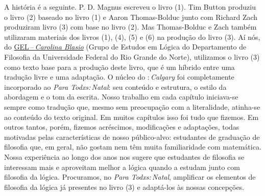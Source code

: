 \noindent A história é a seguinte.
P. D. Magnus escreveu o livro (1). Tim Button produziu o livro (2) baseado no livro (1) e Aaron Thomas-Bolduc junto com Richard Zach produziram  livro (3) com base no livro (2).
Mas Thomas-Bolduc e Zach também utilizaram materiais dos livros (1), (4), (5) e (6) na produção do livro (3).
Aí nós, do \href{https://gelogica.weebly.com/}{GEL\,--\,\textit{Carolina Blasio}} (Grupo de Estudos em Lógica do Departamento de Filosofia da Universidade Federal do Rio Grande do Norte), utilizamos o livro (3) como texto base para a produção deste livro, que é um híbrido entre uma tradução livre e uma adaptação. O núcleo do \forallx:\,\textit{Calgary} foi completamente incorporado ao \textit{Para Todxs:\,Natal}: seu conteúdo e estrutura, o estilo da abordagem e o tom da escrita. Nosso trabalho em cada capítulo iniciava-se sempre como tradução que, mesmo sem preocupação com a literalidade, atinha-se ao conteúdo do texto original. Em muitos capítulos isso foi tudo que fizemos. Em outros tantos, porém, fizemos acréscimos, modificações e adaptações, todas motivadas pelas características de nosso público-alvo: estudantes de graduação de filosofia que, em geral, não gostam nem têm muita familiaridade com matemática.
Nossa experiência ao longo dos anos nos sugere que estudantes de filosofia se interessam mais e aproveitam melhor a lógica quando a estudam junto com filosofia da lógica. Procuramos, no \textit{Para Todxs:\,Natal}, amplificar os elementos de filosofia da lógica já presentes no livro (3) e adaptá-los às nossas concepções.

